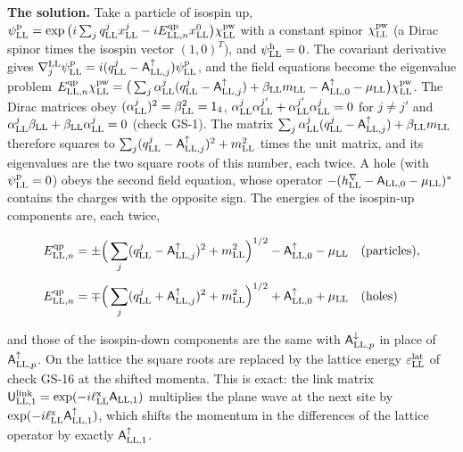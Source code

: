 \documentclass[
  10pt,
]{article}
\begin{document}
\textbf{The solution.} Take a particle of isospin up,
\(\psi^{\rm p}_{\rm LL}=\exp\big(i\sum_jq^j_{\rm LL}x^j_{\rm LL}-iE^{\rm qp}_{{\rm LL},n}x^0_{\rm LL}\big)\chi^{\rm pw}_{\rm LL}\)
with a constant spinor \(\chi^{\rm pw}_{\rm LL}\) (a Dirac spinor times
the isospin vector \((1,0)^T\)), and \(\psi^{\rm h}_{\rm LL}=0\). The
covariant derivative gives
\(\nabla^{\rm LL}_j\psi^{\rm p}_{\rm LL}=i(q^j_{\rm LL}-\mathsf A^\uparrow_{{\rm LL},j})\psi^{\rm p}_{\rm LL}\),
and the field equations become the eigenvalue problem
\(E^{\rm qp}_{{\rm LL},n}\chi^{\rm pw}_{\rm LL}=\big(\sum_j\alpha^j_{\rm LL}(q^j_{\rm LL}-\mathsf A^\uparrow_{{\rm LL},j})+\beta_{\rm LL}m_{\rm LL}-\mathsf A^\uparrow_{{\rm LL},0}-\mu_{\rm LL}\big)\chi^{\rm pw}_{\rm LL}\).
The Dirac matrices obey
\((\alpha^j_{\rm LL})^2=\beta_{\rm LL}^2=\mathsf 1_4\),
\(\alpha^j_{\rm LL}\alpha^{j'}_{\rm LL}+\alpha^{j'}_{\rm LL}\alpha^j_{\rm LL}=0\)
for \(j\neq j'\) and
\(\alpha^j_{\rm LL}\beta_{\rm LL}+\beta_{\rm LL}\alpha^j_{\rm LL}=0\)
(check GS-1). The matrix
\(\sum_j\alpha^j_{\rm LL}(q^j_{\rm LL}-\mathsf A^\uparrow_{{\rm LL},j})+\beta_{\rm LL}m_{\rm LL}\)
therefore squares to
\(\sum_j(q^j_{\rm LL}-\mathsf A^\uparrow_{{\rm LL},j})^2+m_{\rm LL}^2\)
times the unit matrix, and its eigenvalues are the two square roots of
this number, each twice. A hole (with \(\psi^{\rm p}_{\rm LL}=0\)) obeys
the second field equation, whose operator
\(-(h^\nabla_{\rm LL}-\mathsf A_{{\rm LL},0}-\mu_{\rm LL})^{*}\)
contains the charges with the opposite sign. The energies of the
isospin-up components are, each twice,

\[\begin{aligned}&E^{\rm qp}_{{\rm LL},n}=\pm\Big(\sum_j(q^j_{\rm LL}-\mathsf A^\uparrow_{{\rm LL},j})^2+m_{\rm LL}^2\Big)^{1/2}-\mathsf A^\uparrow_{{\rm LL},0}-\mu_{\rm LL}\quad\text{(particles)},\\[4pt]&E^{\rm qp}_{{\rm LL},n}=\mp\Big(\sum_j(q^j_{\rm LL}+\mathsf A^\uparrow_{{\rm LL},j})^2+m_{\rm LL}^2\Big)^{1/2}+\mathsf A^\uparrow_{{\rm LL},0}+\mu_{\rm LL}\quad\text{(holes)}\end{aligned}\]

and those of the isospin-down components are the same with
\(\mathsf A^\downarrow_{{\rm LL},p}\) in place of
\(\mathsf A^\uparrow_{{\rm LL},p}\). On the lattice the square roots are
replaced by the lattice energy \(\varepsilon^{\rm lat}_{\rm LL}\) of
check GS-16 at the shifted momenta. This is exact: the link matrix
\(\mathsf U^{\rm link}_{{\rm LL},1}=\exp(-i\ell^{\rm x}_{\rm LL}\mathsf A_{{\rm LL},1})\)
multiplies the plane wave at the next site by
\(\exp(-i\ell^{\rm x}_{\rm LL}\mathsf A^\uparrow_{{\rm LL},1})\), which
shifts the momentum in the differences of the lattice operator by
exactly \(\mathsf A^\uparrow_{{\rm LL},1}\).
\end{document}
